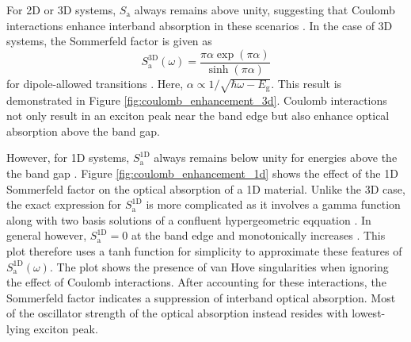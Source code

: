 For 2D or 3D systems, $S_\text{a}$ always remains above unity, suggesting that Coulomb interactions enhance interband absorption in these scenarios \cite{ogawa1991interband}. In the case of 3D systems, the Sommerfeld factor is given as
\begin{equation}
	S_\text{a}^\text{3D}(\omega) = \frac{\pi \alpha \exp(\pi \alpha)}{\sinh(\pi \alpha)}
\end{equation}
for dipole-allowed transitions \cite{elliott1957intensity}. Here, $\alpha \propto 1/\sqrt{\hbar\omega - E_\text{g}}$. This result is demonstrated in Figure \ref{fig:coulomb_enhancement_3d}. Coulomb interactions not only result in an exciton peak near the band edge but also enhance optical absorption above the band gap.


However, for 1D systems, $S_\text{a}^\text{1D}$ always remains below unity for energies above the the band gap \cite{ogawa1991interband}. Figure \ref{fig:coulomb_enhancement_1d} shows the effect of the 1D Sommerfeld factor on the optical absorption of a 1D material. Unlike the 3D case, the exact expression for $S_\text{a}^\text{1D}$ is more complicated as it involves a gamma function along with two basis solutions of a confluent hypergeometric eqquation \cite{ogawa1991optical}. In general however, $S_\text{a}^\text{1D} = 0$ at the band edge \cite{ogawa1991optical} and monotonically increases \cite{ogawa1991optical}. This plot therefore uses a tanh function for simplicity to approximate these features of $S_\text{a}^\text{1D}(\omega)$. The plot shows the presence of van Hove singularities when ignoring the effect of Coulomb interactions. After accounting for these interactions, the Sommerfeld factor indicates a suppression of interband optical absorption. Most of the oscillator strength of the optical absorption instead resides with lowest-lying exciton peak.


